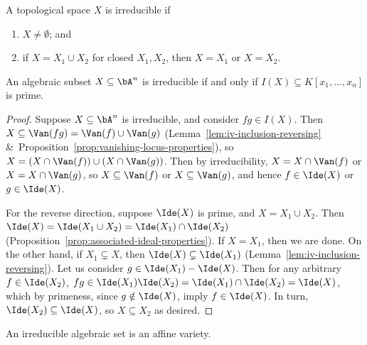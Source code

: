\begin{definition}
    A topological space \(X\) is irreducible if
    \begin{enumerate}[label={(\roman*)}, itemsep=0mm]
        \item \(X \neq \emptyset\); and
        \item if \(X = X_1 \cup X_2\) for closed \(X_1,X_2\),
            then \(X = X_1\) or \(X = X_2\).
    \end{enumerate}
\end{definition}
\begin{proposition}
    An algebraic subset \(X \subseteq \bA^n\) is irreducible
    if and only if \(I(X) \subseteq K[x_1,\hdots,x_n]\) is prime.
\end{proposition}
\begin{proof}
    Suppose \(X \subseteq \bA^n\) is irreducible,
    and consider \(fg \in I(X)\).
    Then \(X \subseteq \Van(fg) = \Van(f) \cup \Van(g)\)
    (Lemma~\ref{lem:iv-inclusion-reversing} \&~Proposition~\ref{prop:vanishing-locus-properties}),
    so \(X = (X \cap \Van(f)) \cup (X \cap \Van(g))\).
    Then by irreducibility, \(X = X \cap \Van(f)\) or \(X = X \cap \Van(g)\),
    so \(X \subseteq \Van(f)\) or \(X \subseteq \Van(g)\),
    and hence \(f \in \Ide(X)\) or \(g \in \Ide(X)\).

    For the reverse direction, suppose \(\Ide(X)\) is prime,
    and \(X = X_1 \cup X_2\).
    Then \(\Ide(X) = \Ide(X_1 \cup X_2) = \Ide(X_1) \cap \Ide(X_2)\)
    (Proposition~\ref{prop:associated-ideal-properties}).
    If \(X = X_1\), then we are done.
    On the other hand, if \(X_1 \subsetneq X\),
    then \(\Ide(X) \subsetneq \Ide(X_1)\) (Lemma~\ref{lem:iv-inclusion-reversing}).
    Let us consider \(g \in \Ide(X_1) - \Ide(X)\).
    Then for any arbitrary \(f \in \Ide(X_2)\),
    \(fg \in \Ide(X_1)\Ide(X_2) = \Ide(X_1) \cap \Ide(X_2) = \Ide(X)\),
    which by primeness, since \(g \notin \Ide(X)\),
    imply \(f \in \Ide(X)\).
    In turn, \(\Ide(X_2) \subseteq \Ide(X)\),
    so \(X \subseteq X_2\) as desired.
\end{proof}
\begin{definition}
    An irreducible algebraic set is an affine variety.
\end{definition}

